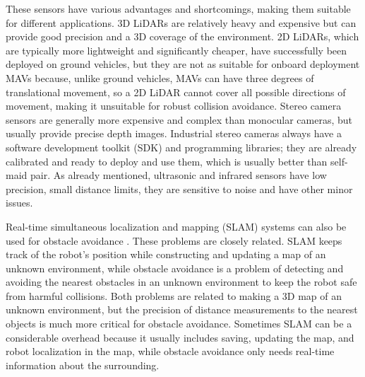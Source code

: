 These sensors have various advantages and shortcomings, making them suitable for different applications. 
3D LiDARs are relatively heavy and expensive but can provide good precision and a 3D coverage of the environment.
2D LiDARs, which are typically more lightweight and significantly cheaper, have successfully been deployed on ground vehicles, but they are not as suitable for onboard deployment MAVs because, unlike ground vehicles, MAVs can have three degrees of translational movement, so a 2D LiDAR cannot cover all possible directions of movement, making it unsuitable for robust collision avoidance.
Stereo camera sensors are generally more expensive and complex than monocular cameras, but usually provide precise depth images. 
Industrial stereo cameras always have a software development toolkit (SDK) and programming libraries; they are already calibrated and ready to deploy and use them, which is usually better than self-maid pair.
As already mentioned, ultrasonic and infrared sensors have low precision, small distance limits, they are sensitive to noise and have other minor issues.

Real-time simultaneous localization and mapping (SLAM) systems can also be used for obstacle avoidance \cite{Moreno2014}. 
These problems are closely related. 
SLAM keeps track of the robot's position while constructing and updating a map of an unknown environment, while obstacle avoidance is a problem of detecting and avoiding the nearest obstacles in an unknown environment to keep the robot safe from harmful collisions.
Both problems are related to making a 3D map of an unknown environment, but the precision of distance measurements to the nearest objects is much more critical for obstacle avoidance.
Sometimes SLAM can be a considerable overhead because it usually includes saving, updating the map, and robot localization in the map, while obstacle avoidance only needs real-time information about the surrounding.


